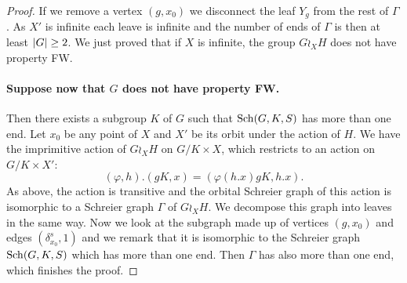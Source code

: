 \begin{proof}
If we remove a vertex $(g,x_0)$ we disconnect the leaf $Y_g$ from the rest of $\Gamma$. As $X'$ is infinite each leave is infinite and the number of ends of $\Gamma$ is then at least $\lvert G\rvert\geq 2$. We just proved that if $X$ is infinite, the group $G\wr_XH$ does not have property FW.
%
%
%
\paragraph{Suppose now that $G$ does not have property FW.} Then there exists a subgroup $K$ of $G$ such that $\operatorname{Sch}(G,K,S)$ has more than one end.
Let $x_0$ be any point of $X$ and $X'$ be its orbit under the action of $H$.
We have the imprimitive action of $G\wr_XH$ on $G/K\times X$, which restricts to an action on $G/K\times X'$:
\[
	(\varphi,h).(gK,x) = (\varphi(h.x) gK, h.x).
\]
As above, the action is transitive and the orbital Schreier graph of this action is isomorphic to a Schreier graph $\Gamma$ of $G\wr_XH$. We decompose this graph into leaves in the same way. Now we look at the subgraph made up of vertices $(g,x_0)$ and edges $(\delta_{x_0}^s,1)$ and we remark that it is isomorphic to the Schreier graph $\operatorname{Sch}(G,K,S)$ which has more than one end. Then $\Gamma$ has also more than one end, which finishes the proof.
\end{proof}
%
%
%
%
